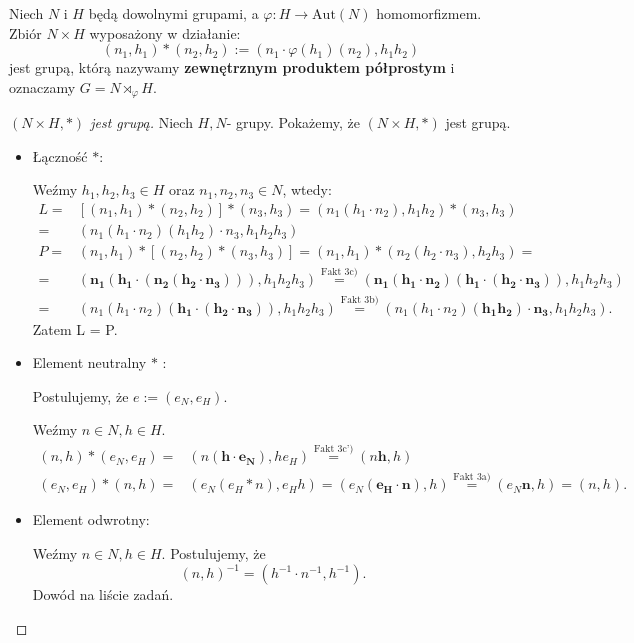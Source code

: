 \begin{definition}
Niech $N$ i $H$ będą dowolnymi grupami, a $\varphi: H \to \text{Aut}(N)$ homomorfizmem. 
Zbiór $N \times H$ wyposażony w działanie:
\[ (n_1, h_1) * (n_2, h_2) := (n_1 \cdot \varphi(h_1)(n_2), h_1 h_2) \]
jest grupą, którą nazywamy \textbf{zewnętrznym produktem półprostym} i oznaczamy $G = N \rtimes_\varphi H$.
\end{definition}
\begin{proof}[$\left( N\times H, * \right) $ jest grupą]
	Niech $H,N$- grupy. Pokażemy, że $\left( N\times H,* \right)$ jest grupą.
	\begin{itemize}
		\item Łączność $*$:
		
			Weźmy $h_1,h_2,h_3 \in H$ oraz $n_1,n_2,n_3\in N$, wtedy:
			 \begin{align*}
				 L =& \left[ \left( n_1,h_1 \right) *\left( n_2,h_2 \right)  \right] * \left( n_3,h_3 \right) = \left( n_1\left( h_1\cdot n_2 \right) , h_1h_2 \right) * \left( n_3,h_3 \right) \\
				 =& \left( n_1\left( h_1\cdot n_2 \right)\left( h_1h_2 \right) \cdot n_3, h_1h_2h_3  \right) \\ 
				 P =& \left( n_1,h_1 \right) *\left[ \left( n_2,h_2 \right) * \left( n_3,h_3 \right)  \right] = \left( n_1,h_1 \right) * \left( n_2\left( h_2\cdot n_3 \right), h_2h_3 \right) = \\
			 =& \left( \bm{n_1\left( h_1 \cdot \left(  n_2\left( h_2\cdot n_3 \right)  \right)\right)}, h_1h_2h_3 \right) \overset{\text{Fakt 3c)}}{=} \left( \bm{n_1\left( h_1\cdot n_2 \right) \left( h_1\cdot \left( h_2\cdot n_3 \right)  \right)}, h_1h_2h_3  \right) \\
		 =&  \left(n_1\left( h_1\cdot n_2 \right) \bm{\left( h_1\cdot \left( h_2\cdot n_3 \right)  \right)}, h_1h_2h_3  \right) \overset{\text{Fakt 3b)}}{=} \left( n_1\left( h_1\cdot n_2 \right) \bm{\left( h_1h_2 \right) \cdot n_3}, h_1h_2h_3 \right) 
			.\end{align*}
Zatem L = P.
\item Element neutralny $*$ :

	Postulujemy, że $e:= \left( e_{N}, e_{H} \right)$.

	Weźmy $n\in N, h\in H$.
	\begin{align*}
		\left( n,h \right) * \left( e_{N},e_{H} \right) =& \left(n\left( \bm{h\cdot e_{N}} \right), he_{H} \right) \overset{\text{Fakt 3c')}}{=} \left( n\bm{h}, h \right) \\
		\left( e_{N},e_{H} \right) * (n,h) =& \left( e_{N}\left( e_{H}* n \right) ,  e_{H}h\right) = \left( e_{N}\left( \bm{e_{H}\cdot n} \right), h  \right) \overset{\text{Fakt 3a)}}{=} \left( e_{N}\bm{n}, h  \right) = \left( n,h \right)
	.\end{align*}

\item Element odwrotny:

	Weźmy $n\in N, h\in H$.
Postulujemy, że \[\left( n,h \right) ^{-1} = \left( h^{-1}\cdot n^{-1}, h^{-1} \right) .\]
Dowód na liście zadań.
	\end{itemize}
\end{proof}
